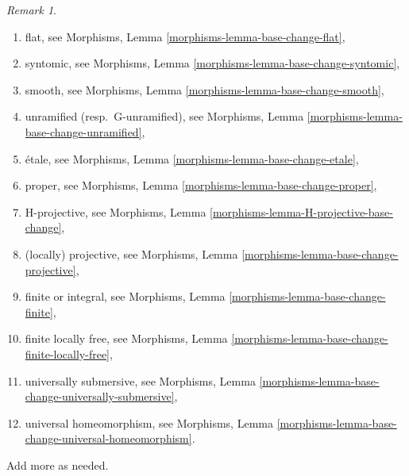 \documentclass{stacks-project}
\theoremstyle{plain}
\theoremstyle{definition}
\theoremstyle{remark}
\newtheorem{remark}[subsection]{Remark}
\numberwithin{equation}{subsection}
\begin{document}
\begin{remark}
\begin{enumerate}
Morphisms, Definition \ref{morphisms-definition-open},
\item flat, see
Morphisms, Lemma \ref{morphisms-lemma-base-change-flat},
\item syntomic, see
Morphisms, Lemma \ref{morphisms-lemma-base-change-syntomic},
\item smooth, see
Morphisms, Lemma \ref{morphisms-lemma-base-change-smooth},
\item unramified (resp.\ G-unramified), see
Morphisms, Lemma \ref{morphisms-lemma-base-change-unramified},
\item \'etale, see
Morphisms, Lemma \ref{morphisms-lemma-base-change-etale},
\item proper, see
Morphisms, Lemma \ref{morphisms-lemma-base-change-proper},
\item H-projective, see
Morphisms, Lemma \ref{morphisms-lemma-H-projective-base-change},
\item (locally) projective, see
Morphisms, Lemma \ref{morphisms-lemma-base-change-projective},
\item finite or integral, see
Morphisms, Lemma \ref{morphisms-lemma-base-change-finite},
\item finite locally free, see
Morphisms, Lemma \ref{morphisms-lemma-base-change-finite-locally-free},
\item universally submersive, see
Morphisms, Lemma \ref{morphisms-lemma-base-change-universally-submersive},
\item universal homeomorphism, see
Morphisms, Lemma \ref{morphisms-lemma-base-change-universal-homeomorphism}.
\end{enumerate}
Add more as needed.
\end{remark}
\end{document}

